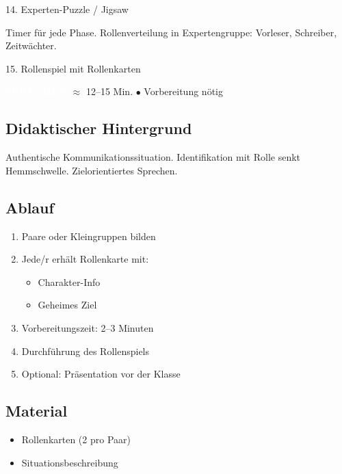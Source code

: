 \documentclass[11pt, a4paper]{article}
\newcommand{\tagSprechen}{\colorbox{sprechen}{\textcolor{white}{\footnotesize\textbf{SPRECHEN}}}}
\newcommand{\zeit}[1]{\textcolor{grau}{\footnotesize $\approx$ #1 Min.}}
\newcommand{\matVorbereitung}{\textcolor{akzent}{$\bullet$ Vorbereitung nötig}}
\begin{document}
\begin{methode}{14. Experten-Puzzle / Jigsaw}
\begin{tipp}
Timer für jede Phase. Rollenverteilung in Expertengruppe: Vorleser, Schreiber, Zeitwächter.
\end{tipp}

\end{methode}

\vspace{1em}

\begin{methode}{15. Rollenspiel mit Rollenkarten}

\tagSprechen{} \zeit{12--15} \hfill \matVorbereitung

\subsection*{Didaktischer Hintergrund}
Authentische Kommunikationssituation. Identifikation mit Rolle senkt Hemmschwelle. Zielorientiertes Sprechen.

\subsection*{Ablauf}
\begin{enumerate}[leftmargin=*]
    \item Paare oder Kleingruppen bilden
    \item Jede/r erhält Rollenkarte mit:
    \begin{itemize}
        \item Charakter-Info
        \item Geheimes Ziel
    \end{itemize}
    \item Vorbereitungszeit: 2--3 Minuten
    \item Durchführung des Rollenspiels
    \item Optional: Präsentation vor der Klasse
\end{enumerate}

\subsection*{Material}
\begin{materialbox}
\begin{itemize}[label=$\square$, leftmargin=*]
    \item Rollenkarten (2 pro Paar)
    \item Situationsbeschreibung
\end{itemize}


\end{materialbox}
\end{methode}
\end{document}
